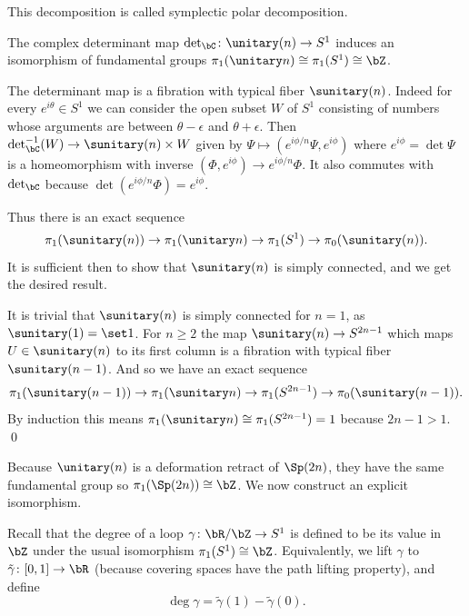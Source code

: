     This decomposition is called {\emphcolor symplectic polar decomposition}.

\eremark

\bprop

    The complex determinant map $\det_\bC\colon\unitary(n)\to S^1$ induces an isomorphism of fundamental groups $\pi_1(\unitary n)\cong\pi_1(S^1)\cong\bZ$.

\eprop

\bproof

    The determinant map is a fibration with typical fiber $\sunitary(n)$.
    Indeed for every $e^{i\theta}\in S^1$ we can consider the open subset $W$ of $S^1$ consisting of numbers whose arguments are between $\theta-\epsilon$ and $\theta+\epsilon$.
    Then $\det_\bC^{-1}(W)\to\sunitary(n)\times W$ given by $\Psi\mapsto(e^{i\phi/n}\Psi,e^{i\phi})$ where $e^{i\phi}=\det\Psi$ is a homeomorphism with inverse $(\Phi,e^{i\phi})\to e^{i\phi/n}\Phi$.
    It also commutes with $\det_\bC$ because $\det(e^{i\phi/n}\Phi)=e^{i\phi}$.

    Thus there is an exact sequence
    $$ \pi_1(\sunitary(n)) \to \pi_1(\unitary n) \to \pi_1(S^1) \to \pi_0(\sunitary(n)) . $$
    It is sufficient then to show that $\sunitary(n)$ is simply connected, and we get the desired result.

    It is trivial that $\sunitary(n)$ is simply connected for $n=1$, as $\sunitary(1)=\set1$.
    For $n\geq2$ the map $\sunitary(n)\to S^{2n-1}$ which maps $U\in\sunitary(n)$ to its first column is a fibration with typical fiber $\sunitary(n-1)$.
    And so we have an exact sequence
    $$ \pi_1(\sunitary(n-1)) \to \pi_1(\sunitary n) \to \pi_1(S^{2n-1}) \to \pi_0(\sunitary(n-1)) . $$
    By induction this means $\pi_1(\sunitary n)\cong\pi_1(S^{2n-1})=1$ because $2n-1>1$.
    \qed

\eproof

Because $\unitary(n)$ is a deformation retract of $\Sp(2n)$, they have the same fundamental group so $\pi_1(\Sp(2n))\cong\bZ$.
We now construct an explicit isomorphism.

Recall that the {\emphcolor degree} of a loop $\gamma\colon\bR/\bZ\to S^1$ is defined to be its value in $\bZ$ under the usual isomorphism $\pi_1(S^1)\cong\bZ$.
Equivalently, we lift $\gamma$ to $\tilde\gamma\colon[0,1]\to\bR$ (because covering spaces have the path lifting property), and define
$$ \deg\gamma = \tilde\gamma(1) - \tilde\gamma(0) . $$

\bthrm[name={maslovsp}]

